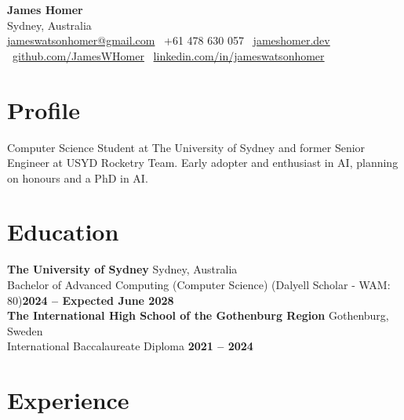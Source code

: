 \documentclass[10pt, letterpaper]{article}
\begin{document}
\begin{center}
    {\LARGE\textbf{James Homer}}\\[5pt]
    Sydney, Australia\\
    \href{mailto:jameswatsonhomer@gmail.com}{jameswatsonhomer@gmail.com} \textbar\
    +61 478 630 057 \textbar\
    \href{https://jameshomer.dev/}{jameshomer.dev} \textbar\
    \href{https://github.com/JamesWHomer}{github.com/JamesWHomer} \textbar\
    \href{https://linkedin.com/in/jameswatsonhomer}{linkedin.com/in/jameswatsonhomer}
\end{center}

\vspace{7pt}

\section*{Profile}

Computer Science Student at The University of Sydney and former Senior Engineer at USYD Rocketry Team. Early adopter and enthusiast in AI, planning on honours and a PhD in AI.

\section*{Education}

\textbf{The University of Sydney} \hfill Sydney, Australia\\
Bachelor of Advanced Computing (Computer Science) (Dalyell Scholar - WAM: 80)\hfill \textbf{2024 -- Expected June 2028} \\

\textbf{The International High School of the Gothenburg Region} \hfill Gothenburg, Sweden\\
International Baccalaureate Diploma \hfill \textbf{2021 -- 2024}

\section*{Experience}
\end{document}
